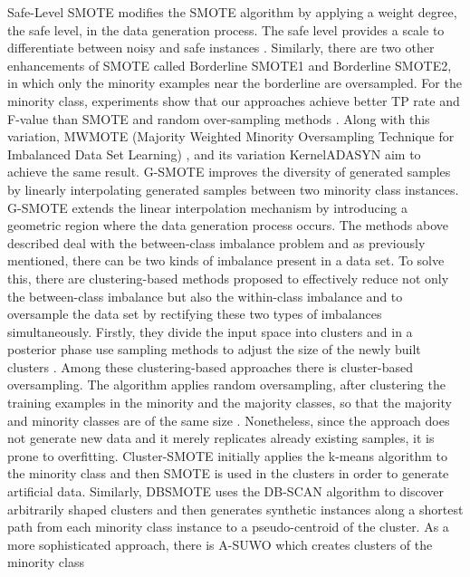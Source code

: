 \documentclass[parskip=full]{scrartcl}
\begin{document}
Safe-Level SMOTE modifies the SMOTE algorithm by applying a weight degree, the 
safe level, in the data generation process. The safe level provides a scale to 
differentiate between noisy and safe instances \cite{Bunk2009}. 
Similarly, there are two other enhancements of SMOTE called Borderline SMOTE1 
and Borderline SMOTE2, in which only the minority examples near the borderline 
are oversampled. For the minority class, experiments show that our approaches 
achieve better TP rate and F-value than SMOTE and random over-sampling methods 
\cite{Han2005}. Along with this variation, MWMOTE (Majority Weighted Minority 
Oversampling Technique for Imbalanced Data Set Learning) \cite{Barua2014}, and 
its variation KernelADASYN \cite{Tang2015} aim to achieve the same result. 
G-SMOTE \cite{Douzas2019} improves the diversity of generated samples by 
linearly interpolating generated samples between two minority class instances. 
G-SMOTE extends the linear interpolation mechanism by introducing a geometric 
region where the data generation process occurs. The methods above described 
deal with the between-class imbalance problem and as previously mentioned, 
there can be two kinds of imbalance present in a data set. To solve this, there 
are clustering-based methods proposed to effectively reduce not only the 
between-class imbalance but also the within-class imbalance and to oversample 
the data set by rectifying these two types of imbalances simultaneously. 
Firstly, they divide the input space into clusters and in a posterior phase use 
sampling methods to adjust the size of the newly built clusters 
\cite{Douzas2017a} \cite{Jo2004}. Among these clustering-based approaches there 
is cluster-based oversampling. The algorithm applies random oversampling, 
after clustering the training examples in the minority and the majority 
classes, so that the majority and minority classes are of the same size 
\cite{Jo2004}. Nonetheless, since the approach does not generate new data and 
it merely replicates already existing samples, it is prone to overfitting. 
Cluster-SMOTE \cite{Cieslak2006} initially applies the k-means algorithm to the 
minority class and then SMOTE is used in the clusters in order to generate 
artificial data. Similarly, DBSMOTE \cite{Bunkhumpornpat2012} uses the DB-SCAN 
algorithm to discover arbitrarily shaped clusters and then generates synthetic 
instances along a shortest path from each minority class instance to a 
pseudo-centroid of the cluster. As a more sophisticated approach, there is 
A-SUWO \cite{Nekooeimehr2016} which creates clusters of the minority class 
\end{document}
